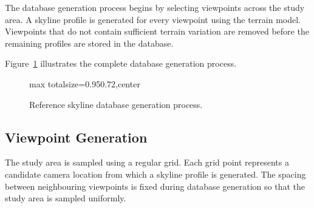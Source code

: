 The database generation process begins by selecting viewpoints across the study area. A skyline profile is generated for every viewpoint using the terrain model. Viewpoints that do not contain sufficient terrain variation are removed before the remaining profiles are stored in the database.

Figure~\ref{fig:database_generation} illustrates the complete database generation process.

\begin{figure}[H]
\centering
\begin{adjustbox}{max totalsize={0.95\textwidth}{0.72\textheight},center}
\end{adjustbox}
\caption{Reference skyline database generation process.}
\label{fig:database_generation}
\end{figure}

\subsection{Viewpoint Generation}

The study area is sampled using a regular grid. Each grid point represents a candidate camera location from which a skyline profile is generated. The spacing between neighbouring viewpoints is fixed during database generation so that the study area is sampled uniformly.

